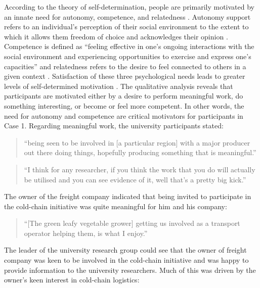 According to the theory of self-determination, people are primarily motivated by an innate need for autonomy, competence, and relatedness \citep{deci1989self}. Autonomy support refers to an individual's perception of their social environment to the extent to which it allows them freedom of choice and acknowledges their opinion \citep{sweet2012testing}. Competence is defined as \enquote{feeling effective in one's ongoing interactions with the social environment and experiencing opportunities to exercise and express one's capacities} and relatedness refers to the desire to feel connected to others in a given context \citep{deci2001need}. Satisfaction of these three psychological needs leads to greater levels of self-determined motivation \citep{sweet2012testing}. The qualitative analysis reveals that participants are motivated either by a desire to perform meaningful work, do something interesting, or become or feel more competent. In other words, the need for autonomy and competence are critical motivators for participants in Case 1. Regarding meaningful work, the university participants stated:

\begin{quote}
\small
\enquote{being seen to be involved in [a particular region] with a major producer out there doing things, hopefully producing something that is meaningful.} \\
\end{quote}

\begin{quote}
\small
\enquote{I think for any researcher, if you think the work that you do will actually be utilised and you can see evidence of it, well that’s a pretty big kick.} \\
\end{quote}

The owner of the freight company indicated that being invited to participate in the cold-chain initiative was quite meaningful for him and his company:

\begin{quote}
\small
\enquote{[The green leafy vegetable grower] getting us involved as a transport operator helping them, is what I enjoy.} \\
\end{quote}

The leader of the university research group could see that the owner of freight company was keen to be involved in the cold-chain initiative and was happy to provide information to the university researchers. Much of this was driven by the owner's keen interest in cold-chain logistics:

